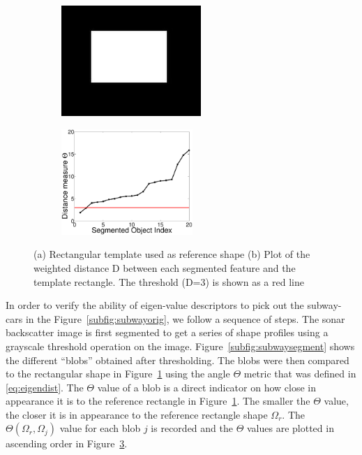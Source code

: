 \documentclass {udthesis}
\begin{document}
\begin{figure}
\centering
  \begin{subfigure}[]{0.3\textwidth}
      \includegraphics[width=\textwidth]{eigenrect}
      \caption{}
      \label{subfig:subwayrect}
  \end{subfigure}
  \begin{subfigure}[]{0.4\textwidth}
      \includegraphics[width=\textwidth,height=4cm]{subway_dot_prod}
      \caption{}
      \label{subfig:eigendistances}
  \end{subfigure}
\caption{(a) Rectangular template used as reference shape (b) Plot of the weighted distance D between each segmented feature and the template rectangle. The threshold (D=3) is shown as a red line}
\end{figure}


In order to verify the ability of eigen-value descriptors to pick out the subway-cars in the Figure~\ref{subfig:subwayorig}, we follow a sequence of steps. The sonar backscatter image is first segmented to get a series of shape profiles using a grayscale threshold operation on the image. Figure~\ref{subfig:subwaysegment} shows the different ``blobs'' obtained after thresholding. The blobs were then compared to the rectangular shape in Figure~\ref{subfig:subwayrect} using the angle $\Theta$ metric that was defined in \eqref{eq:eigendist}. The $\Theta$ value of a blob is a direct indicator on how close in appearance it is to the reference rectangle in Figure~\ref{subfig:subwayrect}. The smaller the $\Theta$ value, the closer it is in appearance to the reference rectangle shape $\Omega_r$. The $\Theta(\Omega_r,\Omega_j)$ value for each blob $j$ is recorded and the $\Theta$ values are plotted in ascending order in Figure~\ref{subfig:eigendistances}. 
\end{document}
